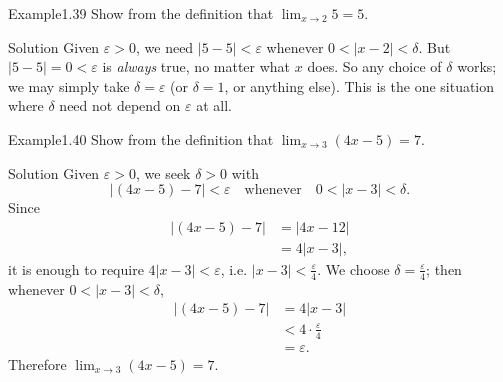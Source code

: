 \documentclass[a4paper,12pt,oneside]{memoir}
\begin{document}
\begin{workedexample}
\begin{envexample}{Example}{1.39}{}
Show from the definition that \(\lim_{x \to 2} 5 = 5\).
\end{envexample}
\begin{envsolution}{Solution}{}{}
Given \(\varepsilon > 0\), we need \(|5 - 5| < \varepsilon\) whenever \(0 < |x - 2| < \delta\). But \(|5 - 5| = 0 < \varepsilon\) is \emph{always} true, no matter what \(x\) does. So any choice of \(\delta\) works; we may simply take \(\delta = \varepsilon\) (or \(\delta = 1\), or anything else). This is the one situation where \(\delta\) need not depend on \(\varepsilon\) at all.
\end{envsolution}
\end{workedexample}
\begin{workedexample}
\begin{envexample}{Example}{1.40}{}
Show from the definition that \(\lim_{x \to 3} (4x - 5) = 7\).
\end{envexample}
\begin{envsolution}{Solution}{}{}
Given \(\varepsilon > 0\), we seek \(\delta > 0\) with \[ |(4x - 5) - 7| < \varepsilon \quad \text{whenever} \quad 0 < |x - 3| < \delta. \] Since \[ \begin{aligned} |(4x - 5) - 7| &= |4x - 12|\\ &= 4 |x - 3|, \end{aligned} \] it is enough to require \(4 |x - 3| < \varepsilon\), i.e. \(|x - 3| < \tfrac{\varepsilon}{4}\). We choose \(\delta = \tfrac{\varepsilon}{4}\); then whenever \(0 < |x - 3| < \delta\), \[ \begin{aligned} |(4x - 5) - 7| &= 4 |x - 3|\\ &< 4 \cdot \tfrac{\varepsilon}{4}\\ &= \varepsilon. \end{aligned} \] Therefore \(\lim_{x \to 3} (4x - 5) = 7\).
\end{envsolution}
\end{workedexample}
\end{document}
